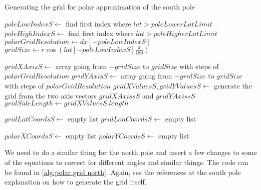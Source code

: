 \begin{algorithm}[htb]
    \caption{Generating the grid for polar approximation of the south pole}
    \label{alg:polar grid south}
    $poleLowIndexS \leftarrow $ find first index where $lat > poleLowerLatLimit$ \;
    $poleHighIndexS \leftarrow $ find first index where $lat > poleHigherLatLimit$ \;
    $polarGridResolution \leftarrow dx[-poleLowIndexS] $ 
    $gridSize \leftarrow r \cos(lat[-poleLowIndexS] \frac{\pi}{180})$ 
    \BlankLine

    $gridXAxisS \leftarrow $ array going from $-gridSize$ to $gridSize$ with steps of $polarGridResolution$ \;
    $gridYAxisS \leftarrow $ array going from $-gridSize$ to $gridSize$ with steps of $polarGridResolution$ \;
    $gridXValuesS, gridYValuesS \leftarrow $ generate the grid from the two axis vectors $gridXAxissS$ and $gridYAxissS$ \;
    $gridSideLength \leftarrow gridXValuesS.length $ 
    \BlankLine 

    $gridLatCoordsS \leftarrow $ empty list \;
    $gridLonCoordsS \leftarrow $ empty list \;

    \BlankLine
    $polarXCoordsS \leftarrow$ empty list \;
    $polarYCoordsS \leftarrow$ empty list \;
\end{algorithm}

We need to do a similar thing for the north pole and insert a few changes to some of the equations to correct for different angles and similar things. The code can be found in 
\autoref{alg:polar grid north}. Again, see the references at the south pole explanation on how to generate the grid itself.

